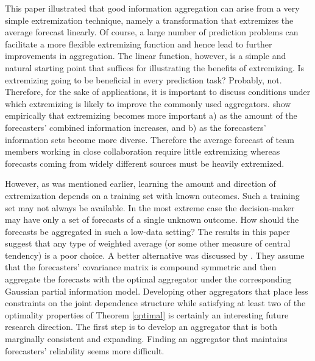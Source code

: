 \documentclass[11pt]{article}
\theoremstyle{definition}
\theoremstyle{definition}
\begin{document}
This paper illustrated that good information aggregation can arise from a very simple extremization technique, namely a transformation that extremizes the average forecast linearly. Of course, a large number of prediction problems can facilitate a more flexible extremizing function and hence lead to further improvements in aggregation. The linear function, however, is a simple and natural starting point that suffices for illustrating the benefits of extremizing. Is extremizing going to be beneficial in every prediction task? Probably, not. 
Therefore, for the sake of applications, it is important to discuss conditions under which extremizing is likely to improve the commonly used aggregators. \cite{satopaamodeling} show empirically that extremizing becomes more important a) as the amount of the forecasters' combined information increases, and b) as the forecasters' information sets become more diverse. Therefore the average forecast of team members working in close collaboration require little extremizing whereas forecasts coming from widely different sources must be heavily extremized.  




However, as was mentioned earlier, learning the amount and direction of extremization depends on a training set with known outcomes. Such a training set may not always be available. In the most extreme case  the decision-maker may have only a set of forecasts of a single unknown outcome. How should the forecasts be aggregated in such a low-data setting? The results in this paper suggest that any type of weighted average (or some other measure of central tendency) is a poor choice. A better alternative was discussed by \cite{satopaamodeling}. They assume that the forecasters' covariance matrix is compound symmetric and then aggregate the forecasts with the optimal aggregator under the corresponding Gaussian partial information model. 
 Developing other aggregators that place less constraints on the joint dependence structure while satisfying at least two of the optimality properties of Theorem \ref{optimal} is certainly an interesting future research direction. The first step is to develop an aggregator that is both marginally consistent and expanding. Finding an aggregator that maintains forecasters' reliability seems more difficult. 
\end{document}
